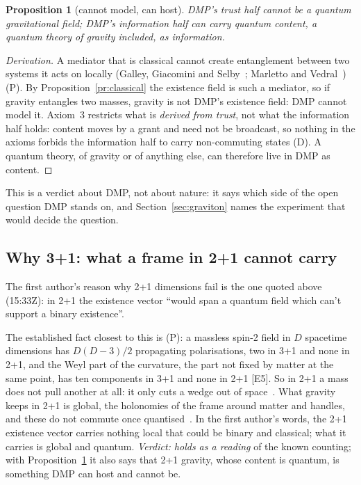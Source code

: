 \documentclass[11pt,a4paper]{article}
\newtheorem{proposition}{Proposition}
\theoremstyle{definition}
\theoremstyle{remark}
\newcommand{\chk}[1]{\textsf{[#1]}}
\newcommand{\tagD}{\textsf{(D)}}
\newcommand{\tagP}{\textsf{(P)}}
\begin{document}
\begin{proposition}[cannot model, can host]\label{pr:host}
DMP's trust half cannot be a quantum gravitational field; DMP's information half can carry quantum content, a quantum theory of gravity
included, as information.
\end{proposition}

\begin{proof}[Derivation]
A mediator that is classical cannot create entanglement between two systems it acts on locally (Galley, Giacomini and Selby~\cite{ggs};
Marletto and Vedral~\cite{mv}) \tagP. By Proposition~\ref{pr:classical} the existence field is such a mediator, so if gravity entangles two
masses, gravity is not DMP's existence field: DMP cannot model it. Axiom~3 restricts what is \emph{derived from trust}, not what the
information half holds: content moves by a grant and need not be broadcast, so nothing in the axioms forbids the information half to
carry non-commuting states \tagD. A quantum theory, of gravity or of anything else, can therefore live in DMP as content.
\end{proof}

\noindent This is a verdict about DMP, not about nature: it says which side of the open question DMP stands on, and
Section~\ref{sec:graviton} names the experiment that would decide the question.

\subsection{Why 3+1: what a frame in 2+1 cannot carry}\label{sec:21}

The first author's reason why 2+1 dimensions fail is the one quoted above (15:33Z): in 2+1 the existence vector ``would span a quantum
field which can't support a binary existence''.

The established fact closest to this is \tagP: a massless spin-2 field in $D$ spacetime dimensions has $D(D-3)/2$ propagating
polarisations, two in 3+1 and none in 2+1, and the Weyl part of the curvature, the part not fixed by matter at the same point, has ten
components in 3+1 and none in 2+1 \chk{E5}. So in 2+1 a mass does not pull another at all: it only cuts a wedge out of space~\cite{djt}.
What gravity keeps in 2+1 is global, the holonomies of the frame around matter and handles, and these do not commute once
quantised~\cite{nr}. In the first author's words, the 2+1 existence vector carries nothing local that could be binary and classical; what
it carries is global and quantum. \emph{Verdict: holds as a reading} of the known counting; with Proposition~\ref{pr:host} it also
says that 2+1 gravity, whose content is quantum, is something DMP can host and cannot be.
\end{document}

